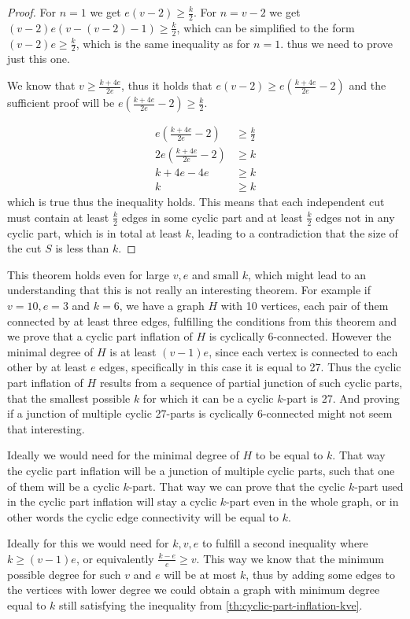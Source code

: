 \documentclass[12pt, twoside]{book}
\begin{document}
\begin{proof}
	For $n=1$ we get $e(v-2)\geq \frac{k}{2}$. For $n=v-2$ we get $(v-2)e(v-(v-2)-1)\geq\frac{k}{2}$, which can be simplified to the form $(v-2)e\geq\frac{k}{2}$, which is the same inequality as for $n=1$. thus we need to prove just this one.
	
	We know that $v\geq \frac{k+4e}{2e}$, thus it holds that $e(v-2)\geq e(\frac{k+4e}{2e}-2)$ and the sufficient proof will be $e(\frac{k+4e}{2e}-2)\geq \frac{k}{2}$.
	
	\begin{align*}
		e\left(\frac{k+4e}{2e}-2\right)&\geq \frac{k}{2} \\
		2e\left(\frac{k+4e}{2e}-2\right)&\geq k \\
		k+4e-4e&\geq k \\
		k&\geq k
	\end{align*}
	which is true thus the inequality holds. This means that each independent cut must contain at least $\frac{k}{2}$ edges in some cyclic part and at least $\frac{k}{2}$ edges not in any cyclic part, which is in total at least $k$, leading to a contradiction that the size of the cut $S$ is less than $k$.
\end{proof}

This theorem holds even for large $v,e$ and small $k$, which might lead to an understanding that this is not really an interesting theorem. For example if $v=10,e=3$ and $k=6$, we have a graph $H$ with 10 vertices, each pair of them connected by at least three edges, fulfilling the conditions from this theorem and we prove that a cyclic part inflation of $H$ is cyclically 6-connected. However the minimal degree of $H$ is at least $(v-1)e$, since each vertex is connected to each other by at least $e$ edges, specifically in this case it is equal to 27. Thus the cyclic part inflation of $H$ results from a sequence of partial junction of such cyclic parts, that the smallest possible $k$ for which it can be a cyclic $k$-part is 27. And proving if a junction of multiple cyclic 27-parts is cyclically 6-connected might not seem that interesting.

Ideally we would need for the minimal degree of $H$ to be equal to $k$. That way the cyclic part inflation will be a junction of multiple cyclic parts, such that one of them will be a cyclic $k$-part. That way we can prove that the cyclic $k$-part used in the cyclic part inflation will stay a cyclic $k$-part even in the whole graph, or in other words the cyclic edge connectivity will be equal to $k$.

Ideally for this we would need for $k,v,e$ to fulfill a second inequality where $k\geq (v-1)e$, or equivalently $\frac{k-e}{e}\geq v$. This way we know that the minimum possible degree for such $v$ and $e$ will be at most $k$, thus by adding some edges to the vertices with lower degree we could obtain a graph with minimum degree equal to $k$ still satisfying the inequality from \cref{th:cyclic-part-inflation-kve}.
\end{document}
